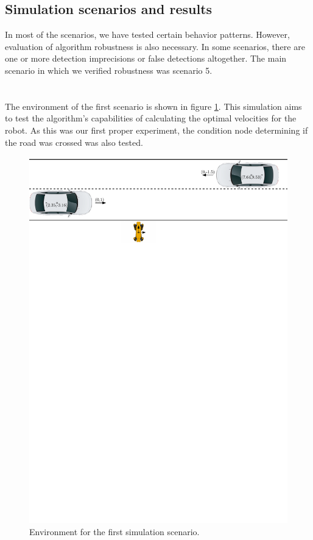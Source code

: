     \subsection{Simulation scenarios and results}
        In most of the scenarios, we have tested certain behavior patterns. However, evaluation of algorithm robustness is also necessary. In some scenarios, there are one or more detection imprecisions or false detections altogether. The main scenario in which we verified robustness was scenario 5.\\\\
        \\
            The environment of the first scenario is shown in figure \ref{fig:scene1}. This simulation aims to test the algorithm's capabilities of calculating the optimal velocities for the robot. As this was our first proper experiment, the condition node determining if the road was crossed was also tested.\\
            \begin{figure}[H]
                \centering
                \includegraphics[width=\linewidth]{images/simulations/scene1.pdf}
                \caption{Environment for the first simulation scenario.}
                \label{fig:scene1}
            \end{figure}
